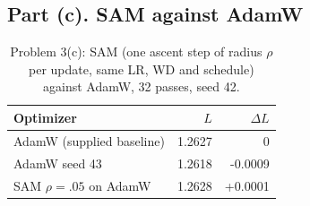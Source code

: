 \subsection*{Part (c). SAM against AdamW}


\begin{table}[H]\centering\small\caption{Problem 3(c): SAM (one ascent step of radius $\rho$ per update, same LR, WD and schedule) against AdamW, 32 passes, seed 42.}\label{tab:sam}
\begin{tabular}{lrr}\toprule Optimizer & $L$ & $\Delta L$ \\ \midrule
AdamW (supplied baseline) & 1.2627 & 0 \\
AdamW seed 43 & 1.2618 & -0.0009 \\
SAM $\rho=.05$ on AdamW & 1.2628 & +0.0001 \\
\bottomrule\end{tabular}\end{table}
